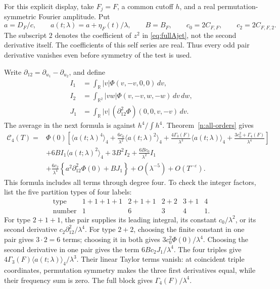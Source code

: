 \documentclass[11pt]{article}
\numberwithin{equation}{section}
\theoremstyle{remark}
\newcommand{\R}{\mathbb R}
\begin{document}
For this explicit display, take $F_j=F$, a common cutoff $h$, and a
real permutation-symmetric Fourier amplitude. Put
\[
 a=D_F/c,\qquad a(t;\lambda)=a+\eta_F(t)/\lambda,\qquad
 B=B_F,\qquad c_0=2C_{F,F},\qquad c_2=2C_{F,F,2}.
\]
The subscript $2$ denotes the coefficient of $z^2$ in
\eqref{eq:fullAjet}, not the second derivative itself. The coefficients
of this self series are real. Thus every odd pair derivative vanishes
even before symmetry of the test is used.

Write $\partial_{12}=\partial_{u_1}-\partial_{u_2}$, and define
\begin{align*}
 I_1&=\int_\R |v|\Phi(v,-v,0,0)\,dv,\\
 I_2&=\int_{\R^2}|vw|\Phi(v,-v,w,-w)\,dv\,dw,\\
 J_1&=\int_\R |v|\,
             (\partial_{12}^2\Phi)(0,0,v,-v)\,dv.
\end{align*}
The average in the next formula is against $h^4/\int h^4$.
Theorem~\ref{n:all-orders} gives
\begin{equation}\label{n:fourth-explicit}
\begin{split}
 \mathcal C_4(T)={}&\Phi(0)\left[
   \langle a(t;\lambda)^4\rangle_4
   +\frac{6c_0}{\lambda^2}\langle a(t;\lambda)^2\rangle_4
   +\frac{4\Gamma_3(F)}{\lambda^3}\langle a(t;\lambda)\rangle_4
   +\frac{3c_0^2+\Gamma_4(F)}{\lambda^4}\right]\\
 &+6B I_1\langle a(t;\lambda)^2\rangle_4
     +3B^2I_2+\frac{6Bc_0}{\lambda^2}I_1\\
 &+\frac{6c_2}{\lambda^4}
       \left\{a^2\partial_{12}^2\Phi(0)+BJ_1\right\}
     +O(\lambda^{-5})+O(T^{-\varepsilon}).
\end{split}
\end{equation}
This formula includes all terms through degree four. To check the
integer factors, list the five partition types of four labels:
\[
\begin{array}{c|ccccc}
 \text{type}&1+1+1+1&2+1+1&2+2&3+1&4\\\hline
 \text{number}&1&6&3&4&1.
\end{array}
\]
For type $2+1+1$, the pair supplies its leading integral, its constant
$c_0/\lambda^2$, or its second derivative
$c_2\partial_{12}^2/\lambda^4$. For type $2+2$, choosing the finite
constant in one pair gives $3\cdot2=6$ terms; choosing it in both
gives $3c_0^2\Phi(0)/\lambda^4$. Choosing the second derivative in one
pair gives the term $6Bc_2J_1/\lambda^4$.
The four triples give $4\Gamma_3(F)\langle a(t;\lambda)\rangle_4/
\lambda^3$. Their linear Taylor terms vanish: at coincident triple
coordinates, permutation symmetry makes the three first derivatives
equal, while their frequency sum is zero. The full block gives
$\Gamma_4(F)/\lambda^4$.
\end{document}
